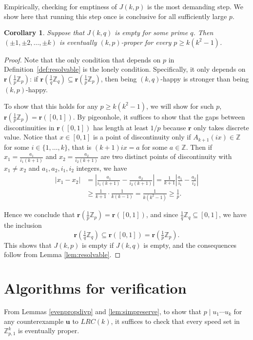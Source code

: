 \documentclass[11pt]{amsart}
\newcommand{\Int}[1]{\mathbb Z_{#1}}
\newcommand{\Z}{\mathbb{Z}}
\newcommand{\Zp}{\Int{p}}
\newcommand{\rbf}{\mathbf{r}}
\newcommand{\ubf}{\mathbf{u}}
\newtheorem{corollary}[theorem]{Corollary}
\theoremstyle{definition}
\theoremstyle{remark}
\begin{document}
Empirically, checking for emptiness of $J(k,p)$ is the most demanding step.
We show here that running this step once is conclusive for all sufficiently large $p$.

\begin{corollary}
    \label{corlarge}
    Suppose that $J(k,q)$ is empty for some prime $q$. 
    Then $(\pm1,\pm2,\ldots,\pm k)$ is eventually $(k,p)$-proper for every $p\geq k(k^2-1)$.
\end{corollary}
\begin{proof}
    Note that the only condition that depends on $p$ in Definition~\ref{def:resolvable} is the lonely condition. 
    Specifically, it only depends on $\rbf(\frac{1}{p}\Zp)$: if $\rbf(\frac{1}{q}\Z_q)\subseteq\rbf(\frac{1}{p}\Zp)$,
    then being $(k,q)$-happy is stronger than being $(k,p)$-happy.

    To show that this holds for any $p\geq k(k^2-1)$, we will show for such $p$, $\rbf(\frac{1}{p}\Zp)=\rbf([0,1])$.
    By pigeonhole, it suffices to show that the gaps between discontinuities in $\rbf([0,1])$ has length at least $1/p$
    because $\rbf$ only takes discrete value. Notice that $x\in[0,1]$ is a point of discontinuity only if $A_{k+1}(ix)\in\Z$ 
    for some $i\in\{1,\ldots,k\}$, that is $(k+1)ix=a$ for some $a\in\Z$. 
    Then if $x_1=\frac{a_1}{i_1(k+1)}$ and $x_2=\frac{a_2}{i_2(k+1)}$ are two distinct points of discontinuity with $x_1\neq x_2$ and
    $a_1,a_2,i_1,i_2$ integers, we have
    \[\begin{split}
        |x_1-x_2|&=\left|\frac{a_1}{i_1(k+1)}-\frac{a_2}{i_2(k+1)}\right|=\frac{1}{k+1}\left|\frac{a_1}{i_1}-\frac{a_2}{i_2}\right|\\ 
        &\geq\frac{1}{k+1}\cdot\frac{1}{k(k-1)}=\frac{1}{k(k^2-1)}\geq\frac{1}{p}.
    \end{split}\]

    Hence we conclude that $\rbf(\frac{1}{p}\Zp)=\rbf([0,1])$, and since $\frac{1}{q}\Z_q\subseteq[0,1]$, 
    we have the inclusion \[\rbf(\tfrac{1}{q}\Z_q)\subseteq\rbf([0,1])=\rbf(\displaystyle\tfrac{1}{p}\Zp).\]
    This shows that $J(k,p)$ is empty if $J(k,q)$ is empty, and the consequences follow from Lemma \ref{lem:resolvable}.
\end{proof}

\section{Algorithms for verification}
\label{sec:algo}
From Lemmas \ref{evenpropdivp} and \ref{lem:simpreserve}, to show that $p\mid u_1\cdots u_k$ for any 
counterexample $\ubf$ to $LRC(k)$, it suffices to check that every speed set in $\Int{p,1}^k$ is eventually proper.
\end{document}
